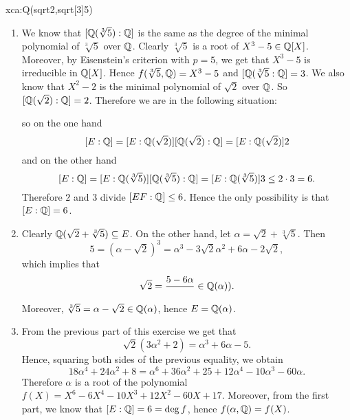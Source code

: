 \begin{sol}{xca:Q(sqrt2,sqrt[3]5)}
    \begin{enumerate}
        \item       
        We know that $[\mathbb{Q}(\sqrt[3]{5}):\mathbb{Q}]$ is the same as
    the degree of the minimal polynomial of $\sqrt[3]{5}$
    over $\mathbb{Q}$.
    Clearly $\sqrt[3]{5}$ is a root of $X^3-5\in\mathbb{Q}[X]$.
    Moreover, by Eisenstein's criterion with
    $p=5$, we get that $X^3-5$ is irreducible in $\mathbb{Q}[X]$.
    Hence $f(\sqrt[3]{5},\mathbb{Q})=X^3-5$ and $[\mathbb{Q}(\sqrt[3]{5}:\mathbb{Q}]=3$.
    We also know that $X^2-2$ is the minimal polynomial of $\sqrt{2}$ over $\mathbb{Q}$. 
    So $[\mathbb{Q}(\sqrt{2}):\mathbb{Q}]=2$.
    Therefore we are in the following situation:
    \
    \begin{center}
    \end{center}
    so on the one hand
    \[
    [E:\mathbb{Q}]=[E:\mathbb{Q}(\sqrt{2})][\mathbb{Q}(\sqrt{2}):\mathbb{Q}]=[E:\mathbb{Q}(\sqrt{2})]2
    \]
    and on the other hand
    \[
    [E:\mathbb{Q}]=[E:\mathbb{Q}(\sqrt[3]{5})][\mathbb{Q}(\sqrt[3]{5}):\mathbb{Q}]=[E:\mathbb{Q}(\sqrt[3]{5})]3\leq 2\cdot 3=6.
    \]
    Therefore $2$ and $3$ divide $[EF:\mathbb{Q}]\leq 6$.
    Hence the only possibility is that $[E:\mathbb{Q}]=6$.
    \item Clearly $\mathbb{Q}(\sqrt{2}+\sqrt[3]{5})\subseteq E$.
    On the other hand, let $\alpha=\sqrt{2}+\sqrt[3]{5}$.
    Then 
    \[
    5=(\alpha-\sqrt{2})^3=\alpha^3-3\sqrt{2}\alpha^2+6\alpha-2\sqrt{2},
    \]
    which implies that 
    \[
    \sqrt{2}=\frac{5-6\alpha}{}\in\mathbb{Q}(\alpha)).
    \]
    Moreover, $\sqrt[3]{5}=\alpha-\sqrt{2}\in\mathbb{Q}(\alpha)$, hence $E=\mathbb{Q}(\alpha)$.
    \item From the previous part of this exercise
    we get that 
    \[
    \sqrt{2}(3\alpha^2+2)=\alpha^3+6\alpha-5.
    \]
    Hence, squaring both sides of the previous equality,
    we obtain
    \[
    18\alpha^4+24\alpha^2+8=\alpha^6+36\alpha^2+25+12\alpha^4-10\alpha^3-60\alpha.
    \]
    Therefore $\alpha$ is a root of the 
    polynomial $f(X)=X^6-6X^4-10X^3+12X^2-60X+17$.
    Moreover, from the first part, we know that
    $[E:\mathbb{Q}]=6=\deg f$, hence $f(\alpha,\mathbb{Q})=f(X)$.
    \end{enumerate}
\end{sol}

